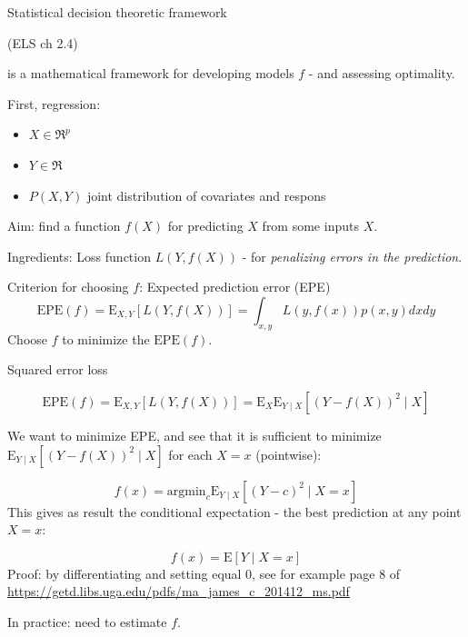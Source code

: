 \documentclass[
  ignorenonframetext,
]{beamer}
\providecommand{\tightlist}{%
  \setlength{\itemsep}{0pt}\setlength{\parskip}{0pt}}
\begin{document}
\begin{frame}{Statistical decision theoretic framework}
\protect\hypertarget{statistical-decision-theoretic-framework}{}

(ELS ch 2.4)

is a mathematical framework for developing models \(f\) - and assessing
optimality.

First, regression:

\begin{itemize}
\tightlist
\item
  \(X \in \Re^p\)
\item
  \(Y \in \Re\)
\item
  \(P(X,Y)\) joint distribution of covariates and respons
\end{itemize}

Aim: find a function \(f(X)\) for predicting \(X\) from some inputs
\(X\).

Ingredients: Loss function \(L(Y,f(X))\) - for \emph{penalizing errors
in the prediction}.

Criterion for choosing \(f\): Expected prediction error (EPE)
\[ \text{EPE}(f)=\text{E}_{X,Y}[L(Y,f(X))]=\int_{x,y}L(y,f(x))p(x,y)dxdy\]
Choose \(f\) to minimize the \(\text{EPE}(f)\).

\end{frame}

\begin{frame}

\begin{block}{Squared error loss}

\[ \text{EPE}(f)=\text{E}_{X,Y}[L(Y,f(X))]=\text{E}_{X}\text{E}_{Y \mid X}[(Y-f(X))^2\mid X]\]

We want to minimize EPE, and see that it is sufficient to minimize
\(\text{E}_{Y\mid X}[(Y-f(X))^2\mid X]\) for each \(X=x\) (pointwise):

\[ f(x)=\text{argmin}_c \text{E}_{Y \mid X}[(Y-c)^2 \mid X=x]\] This
gives as result the conditional expectation - the best prediction at any
point \(X=x\):

\[ f(x)=\text{E}[Y \mid X=x]\] Proof: by differentiating and setting
equal 0, see for example page 8 of
\url{https://getd.libs.uga.edu/pdfs/ma_james_c_201412_ms.pdf}

In practice: need to estimate \(f\).

\end{block}

\end{frame}
\end{document}
